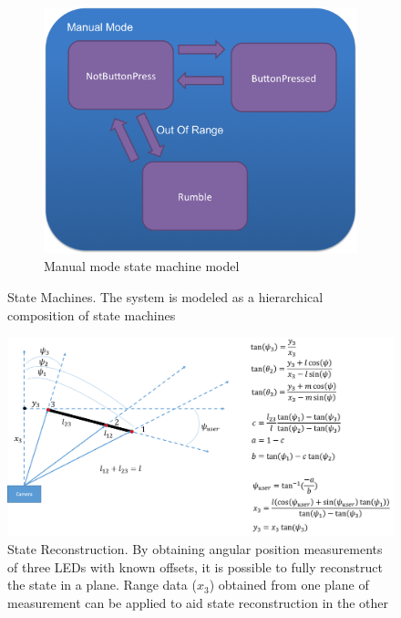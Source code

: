\documentclass[conference, twocolumn]{IEEEtran}
\begin{document}
\begin{figure}
\begin{center}
    \vspace{0.05\linewidth}
    
    \begin{subfigure}[b]{0.7\linewidth}
    \begin{center}
    \includegraphics[width=1\linewidth]{../images/manual}
    \caption{Manual mode state machine model}
     \label{fig:manual_state}
    \end{center}
    \end{subfigure}
\end{center}

\caption{State Machines. The system is modeled as a hierarchical composition of state machines}
\label{fig:state_machines}
\end{figure}

\begin{figure}
\begin{center}
\includegraphics[width=\linewidth]{../images/geometry_and_equations_update}
\end{center}

\caption{State Reconstruction. By obtaining angular position measurements of three LEDs with known offsets, it is possible to fully reconstruct the state in a plane. Range data ($x_3$) obtained from one plane of measurement can be applied to aid state reconstruction in the other}
\label{fig:geometry}
\end{figure}
\end{document}
